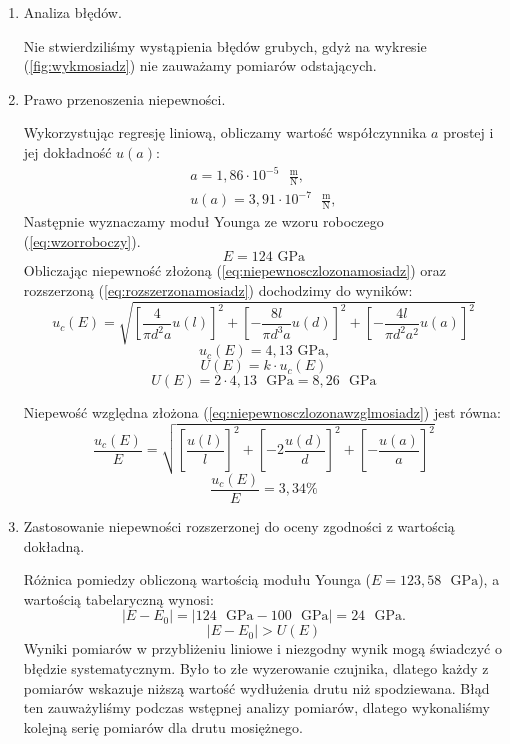 \documentclass [a4paper,11pt]{article}
\begin{document}
	\begin{enumerate}[label=\alph*)]
		
		\item Analiza błędów.
		
		Nie stwierdziliśmy wystąpienia błędów grubych, gdyż na wykresie (\ref{fig:wykmosiadz}) nie zauważamy pomiarów odstających.
		
		\item Prawo przenoszenia niepewności.
		
		Wykorzystując regresję liniową, obliczamy wartość współczynnika $a$ prostej i  jej dokładność $u(a)$:
		\begin{align}
		a = 1,86 \cdot 10^{-5} \text{ }\mathrm{\frac{m}{N}},\label{a} \\
		u(a) = 3,91 \cdot 10^{-7} \text{ }\mathrm{\frac{m}{N}},
		\end{align}
		Następnie wyznaczamy moduł Younga ze wzoru roboczego (\ref{eq:wzorroboczy}).
		$$ E = 124 \text{ GPa} $$
		Obliczając niepewność złożoną (\ref{eq:niepewnosczlozonamosiadz}) oraz rozszerzoną (\ref{eq:rozszerzonamosiadz}) dochodzimy do wyników: 
		\begin{equation}
		\label{eq:niepewnosczlozonamosiadz}
		u_c(E) = \sqrt{ \left[ \frac{4}{\pi d^2a}u(l) \right]^2 + \left[ -\frac{8l}{\pi d^3 a}u(d) \right]^2 + \left[ -\frac{4l}{\pi d^2 a^2}u(a) \right]^2}
		\end{equation}
		$$ u_c(E) = 4,13 \text{ GPa,} $$
		\begin{equation}
		\label{eq:rozszerzonamosiadz}
		U(E) = k\cdot u_c(E)
		\end{equation}
		$$ U(E) = 2 \cdot 4,13 \text{ }\mathrm{GPa} = 8,26 \text{ }\mathrm{GPa} $$
		
		Niepewość względna złożona (\ref{eq:niepewnosczlozonawzglmosiadz}) jest równa:
		\begin{equation}
		\label{eq:niepewnosczlozonawzglmosiadz}
		\frac{u_c(E)}{E} = \sqrt{ \left[ \frac{u(l)}{l} \right]^2 + \left[ -2\frac{u(d)}{d} \right]^2 + \left[ -\frac{u(a)}{a} \right]^2}
		\end{equation}
		$$ \frac{u_c(E)}{E} = 3,34\% $$
		
		\item Zastosowanie niepewności rozszerzonej do oceny zgodności z wartością dokładną.
		
		Różnica pomiedzy obliczoną wartością modułu Younga ($E=123,58  \text{ }\mathrm{GPa}$), a wartością tabelaryczną wynosi:
		\begin{equation}
		\label{eq:roznicamosiadz}
		|E - E_0| = \left|124 \text{ }\mathrm{GPa} - 100 \text{ }\mathrm{GPa}\right| = 24 \text{ }\mathrm{GPa}.
		\end{equation}
		$$
		|E - E_0| > U(E)
		$$
		Wyniki pomiarów w przybliżeniu liniowe i niezgodny wynik mogą świadczyć o błędzie systematycznym. Było to złe wyzerowanie czujnika, dlatego każdy z pomiarów wskazuje niższą wartość wydłużenia drutu niż spodziewana. Błąd ten zauważyliśmy podczas wstępnej analizy pomiarów, dlatego wykonaliśmy kolejną serię pomiarów dla drutu mosiężnego.
	\end{enumerate}
\end{document}
